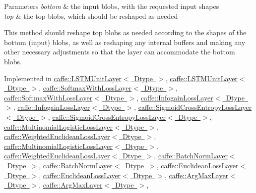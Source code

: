 \begin{DoxyParams}{Parameters}
{\em bottom} & the input blobs, with the requested input shapes \\
\hline
{\em top} & the top blobs, which should be reshaped as needed\\
\hline
\end{DoxyParams}
This method should reshape top blobs as needed according to the shapes of the bottom (input) blobs, as well as reshaping any internal buffers and making any other necessary adjustments so that the layer can accommodate the bottom blobs. 

Implemented in \mbox{\hyperlink{classcaffe_1_1_l_s_t_m_unit_layer_a795bd455f4635e876de32323e9cee96d}{caffe\+::\+L\+S\+T\+M\+Unit\+Layer$<$ Dtype $>$}}, \mbox{\hyperlink{classcaffe_1_1_l_s_t_m_unit_layer_aa6b2edc73f84705744f9f17ad2d014bb}{caffe\+::\+L\+S\+T\+M\+Unit\+Layer$<$ Dtype $>$}}, \mbox{\hyperlink{classcaffe_1_1_softmax_with_loss_layer_a2821b89b0f46a5e2ddaccb2708ab237b}{caffe\+::\+Softmax\+With\+Loss\+Layer$<$ Dtype $>$}}, \mbox{\hyperlink{classcaffe_1_1_softmax_with_loss_layer_ad8f5d429254deaebe4ea5f14bfa0d4d0}{caffe\+::\+Softmax\+With\+Loss\+Layer$<$ Dtype $>$}}, \mbox{\hyperlink{classcaffe_1_1_infogain_loss_layer_a83ed478450bc7f629499fed37f654c5c}{caffe\+::\+Infogain\+Loss\+Layer$<$ Dtype $>$}}, \mbox{\hyperlink{classcaffe_1_1_infogain_loss_layer_aa2903026b3886816270deb038a463759}{caffe\+::\+Infogain\+Loss\+Layer$<$ Dtype $>$}}, \mbox{\hyperlink{classcaffe_1_1_sigmoid_cross_entropy_loss_layer_a305423abeea4bd1652ff7e696aaba808}{caffe\+::\+Sigmoid\+Cross\+Entropy\+Loss\+Layer$<$ Dtype $>$}}, \mbox{\hyperlink{classcaffe_1_1_sigmoid_cross_entropy_loss_layer_a4199eb0668451022f8da20ebca129eb3}{caffe\+::\+Sigmoid\+Cross\+Entropy\+Loss\+Layer$<$ Dtype $>$}}, \mbox{\hyperlink{classcaffe_1_1_multinomial_logistic_loss_layer_a979be47987712c02dfb57a88b2a69f11}{caffe\+::\+Multinomial\+Logistic\+Loss\+Layer$<$ Dtype $>$}}, \mbox{\hyperlink{classcaffe_1_1_weighted_euclidean_loss_layer_a98e3de49ab49d66b8e3ebfe3aa4fbe20}{caffe\+::\+Weighted\+Euclidean\+Loss\+Layer$<$ Dtype $>$}}, \mbox{\hyperlink{classcaffe_1_1_multinomial_logistic_loss_layer_afd5162d1fc8be1a4abdf1afaa96519f8}{caffe\+::\+Multinomial\+Logistic\+Loss\+Layer$<$ Dtype $>$}}, \mbox{\hyperlink{classcaffe_1_1_weighted_euclidean_loss_layer_ac9b915b132fb539ffdd610992c507974}{caffe\+::\+Weighted\+Euclidean\+Loss\+Layer$<$ Dtype $>$}}, \mbox{\hyperlink{classcaffe_1_1_batch_norm_layer_a1acd542fe8fe89d88db9050d048fc7d2}{caffe\+::\+Batch\+Norm\+Layer$<$ Dtype $>$}}, \mbox{\hyperlink{classcaffe_1_1_batch_norm_layer_ab5cc20592aaa28fb2c41fabe842da3fc}{caffe\+::\+Batch\+Norm\+Layer$<$ Dtype $>$}}, \mbox{\hyperlink{classcaffe_1_1_euclidean_loss_layer_a9cbe90ea0130c31bd5b9419a1bbaa555}{caffe\+::\+Euclidean\+Loss\+Layer$<$ Dtype $>$}}, \mbox{\hyperlink{classcaffe_1_1_euclidean_loss_layer_ab7f1b879898ffba67cf5035f6a56d8eb}{caffe\+::\+Euclidean\+Loss\+Layer$<$ Dtype $>$}}, \mbox{\hyperlink{classcaffe_1_1_arg_max_layer_a291a2c548c28e7ab02ddac0cfd3cbdad}{caffe\+::\+Arg\+Max\+Layer$<$ Dtype $>$}}, \mbox{\hyperlink{classcaffe_1_1_arg_max_layer_a658393ef566ec585bf540a1b6f31a929}{caffe\+::\+Arg\+Max\+Layer$<$ Dtype $>$}}, 